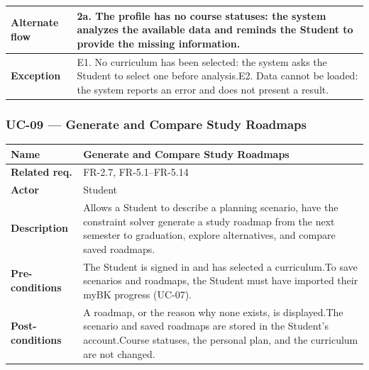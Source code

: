 \begin{longtable}{|p{}|p{}|}
\hline
\textbf{Alternate flow} & 2a. The profile has no course statuses: the system analyzes the available data and reminds the Student to provide the missing information. \\
\hline
\textbf{Exception} & E1. No curriculum has been selected: the system asks the Student to select one before analysis.\newline E2. Data cannot be loaded: the system reports an error and does not present a result. \\
\hline
\end{longtable}

\subsubsection{UC-09 --- Generate and Compare Study Roadmaps}
\begin{longtable}{|p{}|p{}|}
\hline
\textbf{Name} & Generate and Compare Study Roadmaps \\
\hline
\textbf{Related req.} & FR-2.7, FR-5.1--FR-5.14 \\
\hline
\textbf{Actor} & Student \\
\hline
\textbf{Description} & Allows a Student to describe a planning scenario, have the constraint solver generate a study roadmap from the next semester to graduation, explore alternatives, and compare saved roadmaps. \\
\hline
\textbf{Pre-conditions} & The Student is signed in and has selected a curriculum.\newline To save scenarios and roadmaps, the Student must have imported their myBK progress (UC-07). \\
\hline
\textbf{Post-conditions} & A roadmap, or the reason why none exists, is displayed.\newline The scenario and saved roadmaps are stored in the Student's account.\newline Course statuses, the personal plan, and the curriculum are not changed. \\
\hline

\end{longtable}

